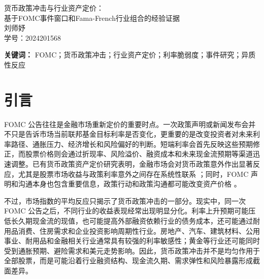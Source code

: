 \documentclass[UTF8,zihao=-4]{ctexart}
\title{}
\author{}
\date{}
\begin{document}
\begin{center}
    {\heiti 货币政策冲击与行业资产定价：}\\[0.4em]
    {\heiti 基于FOMC事件窗口和Fama-French行业组合的经验证据}\\[1.2em]
    { 刘师妤}\\[0.3em]
    { 学号：2024201568}
\end{center}

\vspace{0.8em}


\begin{abstract}
本文围绕FOMC货币政策冲击对美国行业资产价格的异质性影响展开研究。
\end{abstract}

\noindent\textbf{关键词：} FOMC；货币政策冲击；行业资产定价；利率脆弱度；事件研究；异质性反应

\section{引言}


FOMC 公告往往是金融市场重新定价的重要时点。一次政策声明或新闻发布会并不只是告诉市场当前联邦基金目标利率是否变化，更重要的是改变投资者对未来利率路径、通胀压力、经济增长和风险偏好的判断。短端利率会首先反映这些预期修正，而股票价格则会通过折现率、风险溢价、融资成本和未来现金流预期等渠道迅速调整。已有货币政策资产定价研究表明，金融市场会对货币政策意外作出显著反应，尤其是股票市场收益与政策利率意外之间存在系统性联系 \citep{kuttner2001monetary,bernanke2005stock}；同时，FOMC 声明和沟通本身也包含重要信息，政策行动和政策沟通都可能改变资产价格 \citep{gurkaynak2005actions}。

不过，市场指数的平均反应只揭示了货币政策冲击的一部分。现实中，同一次 FOMC 公告之后，不同行业的收益表现经常出现明显分化。利率上升预期可能压低长久期现金流的现值，也可能提高外部融资依赖行业的债务成本，还可能通过耐用品消费、住房需求和企业投资影响周期性行业。房地产、汽车、建筑材料、公用事业、耐用品和金融相关行业通常具有较强的利率敏感性；黄金等行业还可能同时受到通胀预期、避险需求和美元走势影响。因此，货币政策冲击并不是均匀作用于全部股票，而是可能沿着行业融资结构、现金流久期、需求弹性和风险暴露形成截面差异。
\end{document}
